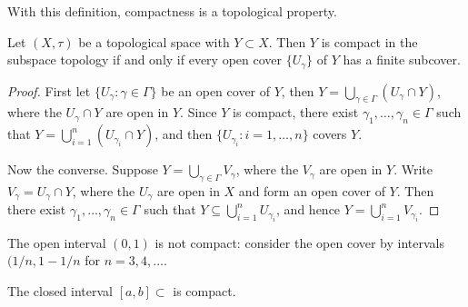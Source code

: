 With this definition, compactness is a topological property.

\begin{lemma}
	Let $(X,\tau)$ be a topological space with $Y\subset X$. Then $Y$ is compact in the subspace topology if and only if every open cover $\{U_\gamma\}$ of $Y$ has a finite subcover.
\end{lemma}

\begin{proof}
	First let $\{U_\gamma:\gamma \in \Gamma\}$ be an open cover of $Y$, then $Y = \bigcup_{\gamma\in\Gamma} (U_\gamma \cap Y)$, where the $U_\gamma \cap Y$ are open in $Y$. Since $Y$ is compact, there exist $\gamma_1,\ldots,\gamma_n \in \Gamma$ such that $Y=\bigcup_{i=1}^n (U_{\gamma_i}\cap Y)$, and then $\{U_{\gamma_i}: i=1,\ldots,n\}$ covers $Y$.

	Now the converse. Suppose $Y=\bigcup_{\gamma\in\Gamma} V_\gamma$, where the $V_\gamma$ are open in $Y$. Write $V_\gamma = U_\gamma \cap Y$, where the $U_\gamma$ are open in $X$ and form an open cover of $Y$. Then there exist $\gamma_1,\ldots,\gamma_n \in \Gamma$ such that $Y \subseteq \bigcup_{i=1}^n U_{\gamma_i}$, and hence $Y=\bigcup_{i=1}^n V_{\gamma_i}$.
\end{proof}

\begin{example}
	The open interval $(0,1)$ is not compact: consider the open cover by intervals $(1/n,1-1/n$ for $n=3,4,\ldots$.
\end{example}

	\pagebreak

\begin{theorem}
	 The closed interval $[a,b] \subset $ is compact.
\end{theorem}

